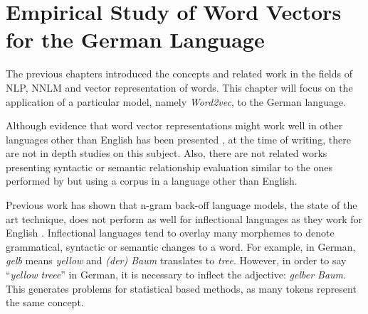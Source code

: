 \chapter{Empirical Study of Word Vectors for the German Language}
\label{chapter:wor2vec_german}











The previous chapters introduced the concepts and related work  in the fields
of  \ac{NLP}, \ac{NNLM} and vector representation of words. This chapter will
focus on the application of a particular model, namely \textit{Word2vec}, to
the German language.  


Although  evidence that word vector representations might work
well in other languages other than English has been presented
\cite{DBLP:journals/corr/MikolovLS13}, at the time of writing, there are not
in depth studies on this subject.  Also, there are not related works  presenting syntactic or
semantic relationship evaluation similar to the
ones performed by \cite{DBLP:journals/corr/abs-1301-3781} but using a corpus
in a language other than English. 

Previous work has shown that  n-gram back-off language models, the state of the art
technique, does not perform  as well for inflectional languages as they work
for English \cite{conf/icassp/MikolovKBGC09}. Inflectional languages tend to
overlay many morphemes to denote grammatical, syntactic or 
semantic changes to a word. For example, in German, \textit{gelb} means
\textit{yellow} and \textit{(der) Baum} translates to \textit{tree}. However, in
order to say ``\textit{yellow treee}'' in German, it is necessary to inflect the
adjective: \textit{gelber Baum}. This generates problems for statistical
based methods, as many tokens represent the same concept.

